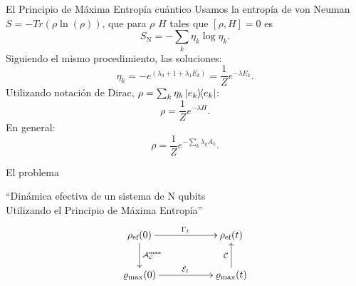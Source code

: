 \begin{frame}{El Principio de Máxima Entropía cuántico}
    Usamos la entropía de von Neuman $S=-Tr(\rho\ln(\rho))$, que para $\rho$ $H$ tales que $[\rho,H]=0$ es
    \begin{equation}
        S_{\text{N}}=-\sum_{k}\eta_{k}\log{\eta_{k}}.\nonumber
    \end{equation}
    Siguiendo el mismo procedimiento, las soluciones:
    \begin{equation}
        \eta_{k}=-e^{(\lambda_{0}+1+\lambda_{1}E_{k})}=\frac{1}{Z}e^{-\lambda E_{k}}.\nonumber
    \end{equation}
    Utilizando notación de Dirac, $\rho=\sum_{k}\eta_{k}\dyad{e_{k}}$:
    \begin{equation}
        \rho=\frac{1}{Z}e^{-\lambda H}.\nonumber
    \end{equation}
    En general:
    \begin{equation}\label{eq:GeneralMaxEnt}
        \rho=\frac{1}{Z}e^{-\sum_{k}\lambda_{k} A_{k}}.\nonumber
    \end{equation}
\end{frame}


\begin{frame}{El problema}
    \begin{center}
        ``Dinámica efectiva de un sistema de N qubits\\
        Utilizando el Principio de Máxima Entropía''
        \begin{displaymath}
            \xymatrix{
              {\rho_{\ef}(0)} \ar[rr]^{\Gamma_{t}} \ar[d]^{\mcA_{\mcC}^{\max}}
              && {\rho_{\ef}(t)}\\
              {\varrho_{\max}(0)} \ar[rr]^{\mcE_{t}}
              && {\varrho_{\max}(t)} \ar[u]^{\mcC}
            }
          \end{displaymath}
    \end{center}
\end{frame}
